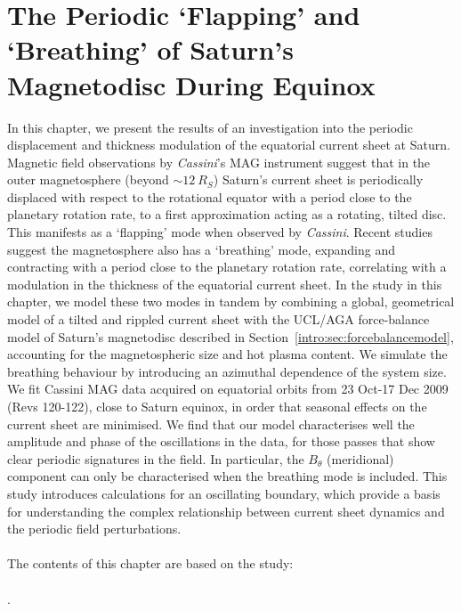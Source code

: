 \chapter[The Periodic Flapping and Breathing of Saturn's Magnetodisc]{The Periodic `Flapping' and `Breathing' of Saturn's Magnetodisc During Equinox}
\label{chap:equinox}
In this chapter, we present the results of an investigation into the periodic displacement and thickness modulation of the equatorial current sheet at Saturn. Magnetic field observations by \textit{Cassini}'s MAG instrument suggest that in the outer magnetosphere (beyond ${\sim}\SI{12}{R_S}$) Saturn's current sheet is periodically displaced with respect to the rotational equator with a period close to  the planetary rotation rate, to a first approximation acting as a rotating, tilted disc. This manifests as a `flapping' mode when observed by \textit{Cassini}. Recent studies suggest the magnetosphere also has a `breathing' mode, expanding and contracting with a period close to the planetary rotation rate, correlating with a modulation in the thickness of the equatorial current sheet. In the study in this chapter, we model these two modes in tandem by combining a global, geometrical model of a tilted and rippled current sheet with the UCL/AGA force-balance model of Saturn's magnetodisc described in Section~\ref{intro:sec:forcebalancemodel}, accounting for the magnetospheric size and hot plasma content. We simulate the breathing behaviour by introducing an azimuthal dependence of the system size. We fit Cassini MAG data acquired on equatorial orbits from 23 Oct{\--}17 Dec 2009 (Revs 120{\--}122), close to Saturn equinox, in order that seasonal effects on the current sheet are minimised. We find that our model characterises well the amplitude and phase of the oscillations in the data, for those passes that show clear periodic signatures in the field. In particular, the $B_\theta$ (meridional) component can only be characterised when the breathing mode is included. This study introduces calculations for an oscillating boundary, which provide a basis for understanding the complex relationship between current sheet dynamics and the periodic field perturbations. \\
\\
The contents of this chapter are based on the study:\\
\\
.

